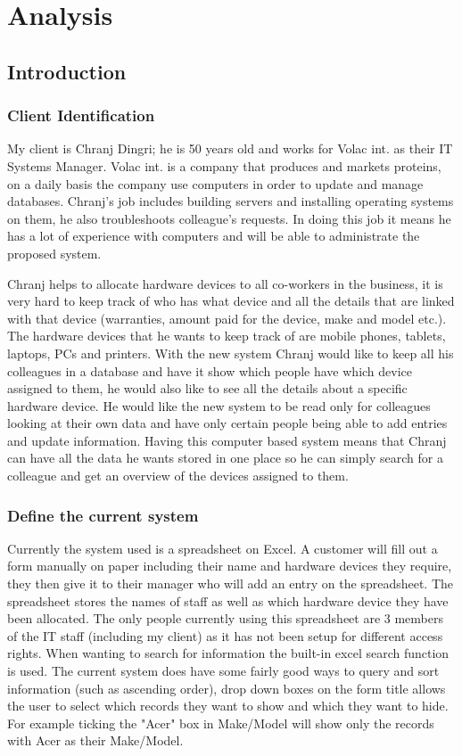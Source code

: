\chapter{Analysis}

\section{Introduction}

\subsection{Client Identification}

My client is Chranj Dingri; he is 50 years old and works for Volac int. as their IT Systems Manager. Volac int. is a company that produces and markets proteins, on a daily basis the company use computers in order to update and manage databases. Chranj's job includes building servers and installing operating systems on them, he also troubleshoots colleague's requests. In doing this job it means he has a lot of experience with computers and will be able to administrate the proposed system.


Chranj helps to allocate hardware devices to all co-workers in the business, it is very hard to keep track of who has what device and all the details that are linked with that device (warranties, amount paid for the device, make and model etc.). The hardware devices that he wants to keep track of are mobile phones, tablets, laptops, PCs and printers. With the new system Chranj would like to keep all his colleagues in a database and have it show which people have which device assigned to them, he would also like to see all the details about a specific hardware device. He would like the new system to be read only for colleagues looking at their own data and have only certain people being able to add entries and update information. Having this computer based system means that Chranj can have all the data he wants stored in one place so he can simply search for a colleague and get an overview of the devices assigned to them. 

\subsection{Define the current system}

Currently the system used is a spreadsheet on Excel. A customer will fill out a form manually on paper including their name and hardware devices they require, they then give it to their manager who will add an entry on the spreadsheet.  The spreadsheet stores the names of staff as well as which hardware device they have been allocated. The only people currently using this spreadsheet are 3 members of the IT staff (including my client) as it has not been setup for different access rights. When wanting to search for information the built-in excel search function is used. The current system does have some fairly good ways to query and sort information (such as ascending order), drop down boxes on the form title allows the user to select which records they want to show and which they want to hide. For example ticking the "Acer" box in Make/Model will show only the records with Acer as their Make/Model. 

